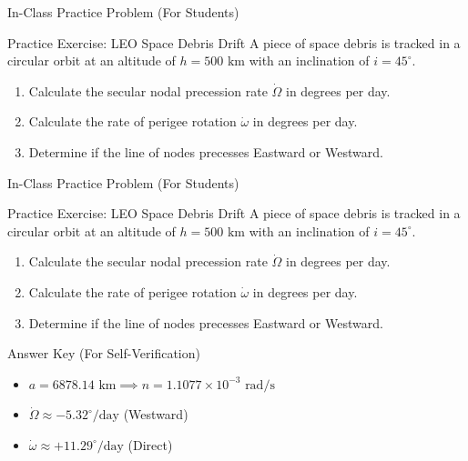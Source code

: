 \documentclass[aspectratio=169,11pt]{beamer}
\begin{document}

\begin{frame}{In-Class Practice Problem (For Students)}
    \begin{block}{Practice Exercise: LEO Space Debris Drift}
        A piece of space debris is tracked in a circular orbit at an altitude of $h = 500\text{ km}$ with an inclination of $i = 45^\circ$.
        \begin{enumerate}
            \item Calculate the secular nodal precession rate $\dot{\Omega}$ in degrees per day.
            \item Calculate the rate of perigee rotation $\dot{\omega}$ in degrees per day.
            \item Determine if the line of nodes precesses Eastward or Westward.
        \end{enumerate}
    \end{block}
\end{frame}

\begin{frame}{In-Class Practice Problem (For Students)}
    \begin{block}{Practice Exercise: LEO Space Debris Drift}
        A piece of space debris is tracked in a circular orbit at an altitude of $h = 500\text{ km}$ with an inclination of $i = 45^\circ$.
        \begin{enumerate}
            \item Calculate the secular nodal precession rate $\dot{\Omega}$ in degrees per day.
            \item Calculate the rate of perigee rotation $\dot{\omega}$ in degrees per day.
            \item Determine if the line of nodes precesses Eastward or Westward.
        \end{enumerate}
    \end{block}

    \vspace{0.3cm}

    \begin{exampleblock}{Answer Key (For Self-Verification)}
        \begin{itemize}
            \item $a = 6878.14\text{ km} \implies n = 1.1077 \times 10^{-3}\text{ rad/s}$
            \item $\dot{\Omega} \approx -5.32^\circ/\text{day}$ (Westward)
            \item $\dot{\omega} \approx +11.29^\circ/\text{day}$ (Direct)
        \end{itemize}
    \end{exampleblock}
\end{frame}
\end{document}
